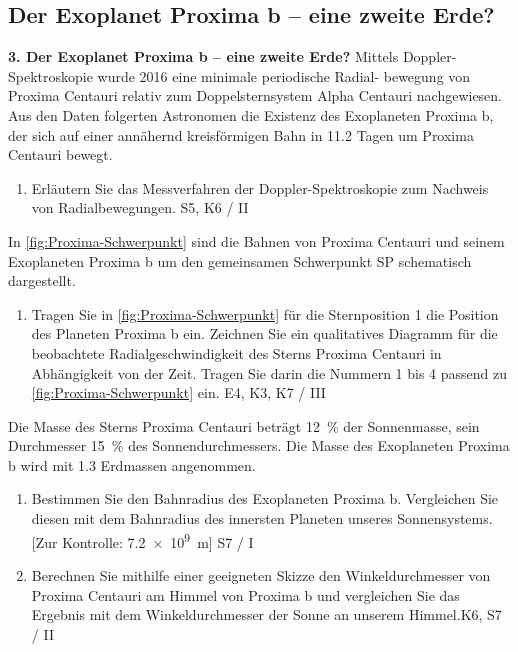 \subsection{Der Exoplanet Proxima b -- eine zweite Erde?}

\begin{aufgabe}
	\textbf{3. Der Exoplanet Proxima b -- eine zweite Erde?}\newline
	Mittels Doppler-Spektroskopie wurde 2016 eine minimale periodische Radial- bewegung von Proxima Centauri relativ zum Doppelsternsystem Alpha Centauri nachgewiesen. Aus den Daten folgerten Astronomen die Existenz des Exoplaneten Proxima b, der sich auf einer annähernd kreisförmigen Bahn in \num{11.2} Tagen um Proxima Centauri bewegt.
	\begin{enumerate}
		\item Erläutern Sie das Messverfahren der Doppler-Spektroskopie zum Nachweis von Radialbewegungen. \newline \hfill S5, K6 / II
	\end{enumerate}
	In \cref{fig:Proxima-Schwerpunkt} sind die Bahnen von Proxima Centauri und seinem Exoplaneten Proxima b um den gemeinsamen Schwerpunkt SP schematisch dargestellt.
	\begin{enumerate}[resume]
		\item Tragen Sie in \cref{fig:Proxima-Schwerpunkt} für die Sternposition 1 die Position des Planeten Proxima b ein. Zeichnen Sie ein qualitatives Diagramm für die beobachtete Radialgeschwindigkeit des Sterns Proxima Centauri in Abhängigkeit von der Zeit. Tragen Sie darin die Nummern 1 bis 4 passend zu \cref{fig:Proxima-Schwerpunkt} ein. \newline \hfill E4, K3, K7  / III
	\end{enumerate}
	Die Masse des Sterns Proxima Centauri beträgt \SI{12}{\percent} der Sonnenmasse, sein Durchmesser \SI{15}{\percent} des Sonnendurchmessers. Die Masse des Exoplaneten Proxima b wird mit \num{1.3} Erdmassen angenommen.
	\begin{enumerate}[resume]
		\item Bestimmen Sie den Bahnradius des Exoplaneten Proxima b. Vergleichen Sie diesen mit dem Bahnradius des innersten Planeten unseres Sonnensystems.\newline \hfill [Zur Kontrolle: \SI{7.2e9}{\meter}] \newline \hfill S7 / I
		\item Berechnen Sie mithilfe einer geeigneten Skizze den Winkeldurchmesser von Proxima Centauri am Himmel von Proxima b und vergleichen Sie das Ergebnis mit dem Winkeldurchmesser der Sonne an unserem Himmel.\newline \hfill K6, S7 / II

\end{enumerate}
\end{aufgabe}
